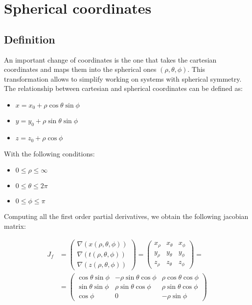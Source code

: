 \chapter{Spherical coordinates}

\section{Definition}
An important change of coordinates is the one that takes the cartesian coordinates and maps them into the spherical ones $(\rho, \theta, \phi)$.
This transformation allows to simplify working on systems with spherical symmetry.
The relationship between cartesian and spherical coordinates can be defined as:

\begin{multicols}{3}
	\begin{itemize}
		\item $x = x_0 + \rho\cos\theta\sin\phi$
		\item $y = y_0 + \rho\sin\theta\sin\phi$
		\item $z = z_0 + \rho\cos\phi$
	\end{itemize}
\end{multicols}

With the following conditions:

\begin{multicols}{3}
	\begin{itemize}
		\item $0\le \rho\le \infty$
		\item $0 \le \theta\le 2\pi$
		\item $0 \le \phi\le \pi$
	\end{itemize}
\end{multicols}

Computing all the first order partial derivatives, we obtain the following jacobian matrix:

\begin{align*}
	J_f &= \begin{pmatrix}\nabla(x(\rho, \theta, \phi))\\\nabla(t(\rho, \theta, \phi))\\\nabla(z(\rho,\theta,\phi))\end{pmatrix} = \begin{pmatrix} x_\rho & x_\theta & x_\phi\\y_\rho & y_\theta & y_\phi\\z_\rho & z_\theta & z_\phi\end{pmatrix}=\\
			&=\begin{pmatrix} \cos\theta\sin\phi & -\rho\sin\theta\cos\phi & \rho\cos\theta\cos\phi\\ \sin\theta\sin\phi & \rho\sin\theta\cos\phi & \rho\sin\theta\cos\phi\\\cos\phi & 0 & -\rho\sin\phi\end{pmatrix}
\end{align*}

